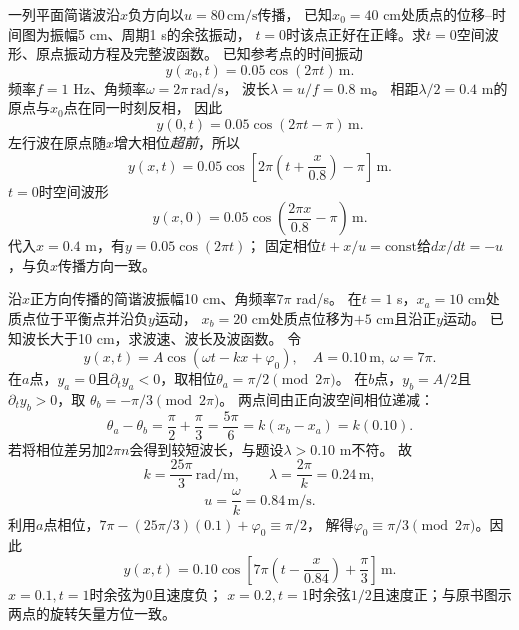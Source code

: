 

\problemtext 一列平面简谐波沿$x$负方向以$u=80\,\mathrm{cm/s}$传播，
已知$x_0=40$ cm处质点的位移--时间图为振幅5 cm、周期1 s的余弦振动，
$t=0$时该点正好在正峰。求$t=0$空间波形、原点振动方程及完整波函数。
\workings
已知参考点的时间振动
\[
y(x_0,t)=0.05\cos(2\pi t)\,\mathrm m.
\]
频率$f=1$ Hz、角频率$\omega=2\pi\,\mathrm{rad/s}$，
波长$\lambda=u/f=0.8$ m。
相距$\lambda/2=0.4$ m的原点与$x_0$点在同一时刻反相，
因此
\[
\boxed{y(0,t)=0.05\cos(2\pi t-\pi)\,\mathrm m}.
\]
左行波在原点随$x$增大相位\emph{超前}，所以
\[
\boxed{y(x,t)=0.05\cos\left[2\pi\left(t+\frac{x}{0.8}\right)-\pi\right]\,\mathrm m}.
\]
$t=0$时空间波形
\[
\boxed{y(x,0)=0.05\cos\left(\frac{2\pi x}{0.8}-\pi\right)\,\mathrm m}.
\]
\crosscheck 代入$x=0.4$ m，有$y=0.05\cos(2\pi t)$；
固定相位$t+x/u=\mathrm{const}$给$dx/dt=-u$，与负$x$传播方向一致。

\problemtext 沿$x$正方向传播的简谐波振幅10 cm、角频率$7\pi$ rad/s。
在$t=1$ s，$x_a=10$ cm处质点位于平衡点并沿负$y$运动，
$x_b=20$ cm处质点位移为$+5$ cm且沿正$y$运动。
已知波长大于10 cm，求波速、波长及波函数。
\workings
令
\[
y(x,t)=A\cos\left(\omega t-kx+\varphi_0\right),
\quad A=0.10\,\mathrm m,\ \omega=7\pi.
\]
在$a$点，$y_a=0$且$\partial_ty_a<0$，取相位$\theta_a=\pi/2\pmod{2\pi}$。
在$b$点，$y_b=A/2$且$\partial_ty_b>0$，取
$\theta_b=-\pi/3\pmod{2\pi}$。
两点间由正向波空间相位递减：
\[
\theta_a-\theta_b=\frac\pi2+\frac\pi3=\frac{5\pi}{6}
=k(x_b-x_a)=k(0.10).
\]
若将相位差另加$2\pi n$会得到较短波长，与题设$\lambda>0.10$ m不符。
故
\[
\boxed{k=\frac{25\pi}{3}\,\mathrm{rad/m}},\qquad
\boxed{\lambda=\frac{2\pi}{k}=0.24\,\mathrm m},
\]
\[
\boxed{u=\frac{\omega}{k}=0.84\,\mathrm{m/s}}.
\]
利用$a$点相位，$7\pi-(25\pi/3)(0.1)+\varphi_0\equiv\pi/2$，
解得$\varphi_0\equiv\pi/3\pmod{2\pi}$。因此
\[
\boxed{y(x,t)=0.10\cos\left[7\pi
\left(t-\frac{x}{0.84}\right)+\frac\pi3\right]\,\mathrm m}.
\]
\crosscheck $x=0.1,t=1$时余弦为0且速度负；
$x=0.2,t=1$时余弦$1/2$且速度正；与原书图示两点的旋转矢量方位一致。

